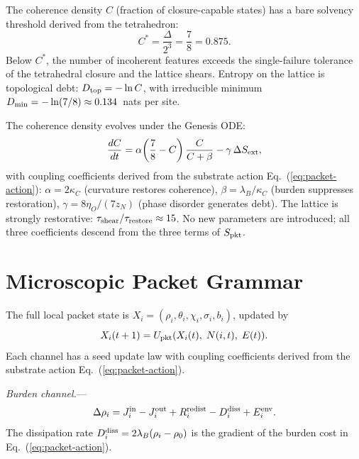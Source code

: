 \documentclass[11pt,twocolumn]{article}
\begin{document}
The coherence density $C$ (fraction of closure-capable states) has a bare solvency threshold derived from the tetrahedron:
\begin{equation}
\label{eq:Cstar}
C^* = \frac{\Delta}{2^3} = \frac{7}{8} = 0.875.
\end{equation}
Below $C^*$, the number of incoherent features exceeds the single-failure tolerance of the tetrahedral closure and the lattice shears.
Entropy on the lattice is topological debt: $D_{\rm top} = -\ln C$, with irreducible minimum $D_{\rm min} = -\ln(7/8) \approx 0.134$~nats per site.

The coherence density evolves under the Genesis ODE:
\begin{equation}
\label{eq:genesis-ode}
\frac{dC}{dt} = \alpha\!\left(\frac{7}{8} - C\right)\frac{C}{C + \beta} - \gamma\,\Delta S_{\rm ext},
\end{equation}
with coupling coefficients derived from the substrate action Eq.~(\ref{eq:packet-action}):
$\alpha = 2\kappa_C$ (curvature restores coherence),
$\beta = \lambda_B/\kappa_C$ (burden suppresses restoration),
$\gamma = 8\eta_O/(7z_N)$ (phase disorder generates debt).
The lattice is strongly restorative: $\tau_{\rm shear}/\tau_{\rm restore} \approx 15$.
No new parameters are introduced; all three coefficients descend from the three terms of $S_{\rm pkt}$.


\section{Microscopic Packet Grammar}
\label{sec:micro}

The full local packet state is $X_i = (\rho_i, \theta_i, \chi_i, \sigma_i, b_i)$, updated by
\begin{equation}
\label{eq:pkt-update}
X_i(t+1) = U_{\rm pkt}(X_i(t),\; N(i,t),\; E(t)).
\end{equation}
Each channel has a seed update law with coupling coefficients derived from the substrate action Eq.~(\ref{eq:packet-action}).

\emph{Burden channel.}---
\begin{equation}
\label{eq:drho}
\Delta\rho_i = J_i^{\rm in} - J_i^{\rm out} + R_i^{\rm redist} - D_i^{\rm diss} + E_i^{\rm env}.
\end{equation}
The dissipation rate $D_i^{\rm diss} = 2\lambda_B(\rho_i - \rho_0)$ is the gradient of the burden cost in Eq.~(\ref{eq:packet-action}).
\end{document}
